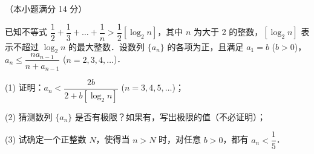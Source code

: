 \begin{question}
（本小题满分 14 分）

已知不等式 $\dfrac{1}{2} + \dfrac{1}{3} + \dots + \dfrac{1}{n} > \dfrac{1}{2}[\log_2 n]$，其中 $n$ 为大于 2 的整数，$[\log_2 n]$ 表示不超过 $\log_2 n$ 的最大整数．设数列 $\{a_n\}$ 的各项为正，且满足 $a_1 = b$ ($b > 0$)，$a_n \leqslant \dfrac{n a_{n-1}}{n + a_{n-1}}$ ($n = 2, 3, 4, \dots$)．

(1) 证明：$a_n < \dfrac{2b}{2 + b[\log_2 n]}$ ($n = 3, 4, 5, \dots$)；

(2) 猜测数列 $\{a_n\}$ 是否有极限？如果有，写出极限的值（不必证明）；

(3) 试确定一个正整数 $N$，使得当 $n > N$ 时，对任意 $b > 0$，都有 $a_n < \dfrac{1}{5}$．

\end{question}